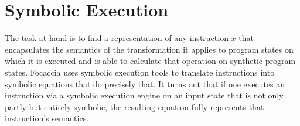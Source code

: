%
%
%

\section{Symbolic Execution}\label{sec:symb_exec}

The task at hand is to find a representation of any instruction $x$ that encapsulates the semantics of the
transformation it applies to program states on which it is executed and is able to calculate that operation on synthetic
program states. Focaccia uses symbolic execution tools to translate instructions into symbolic equations that do
precisely that. It turns out that if one executes an instruction via a symbolic execution engine on an input state that
is not only partly but entirely symbolic, the resulting equation fully represents that instruction's semantics.

